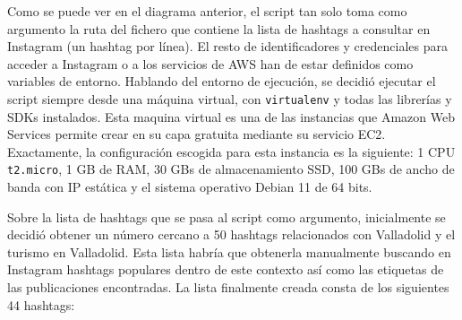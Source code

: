 Como se puede ver en el diagrama anterior, el script tan solo toma como argumento la ruta del fichero que contiene la lista de hashtags a consultar en Instagram (un hashtag por línea). El resto de identificadores y credenciales para acceder a Instagram o a los servicios de AWS han de estar definidos como variables de entorno. Hablando del entorno de ejecución, se decidió ejecutar el script siempre desde una máquina virtual, con \texttt{virtualenv} y todas las librerías y SDKs instalados. Esta maquina virtual es una de las instancias que Amazon Web Services permite crear en su capa gratuita mediante su servicio EC2. Exactamente, la configuración escogida para esta instancia es la siguiente: 1 CPU \texttt{t2.micro}, 1 GB de RAM, 30 GBs de almacenamiento SSD, 100 GBs de ancho de banda con IP estática y el sistema operativo Debian 11 de 64 bits.

Sobre la lista de hashtags que se pasa al script como argumento, inicialmente se decidió obtener un número cercano a 50 hashtags relacionados con Valladolid y el turismo en Valladolid. Esta lista habría que obtenerla manualmente buscando en Instagram hashtags populares dentro de este contexto así como las etiquetas de las publicaciones encontradas. La lista finalmente creada consta de los siguientes 44 hashtags:

